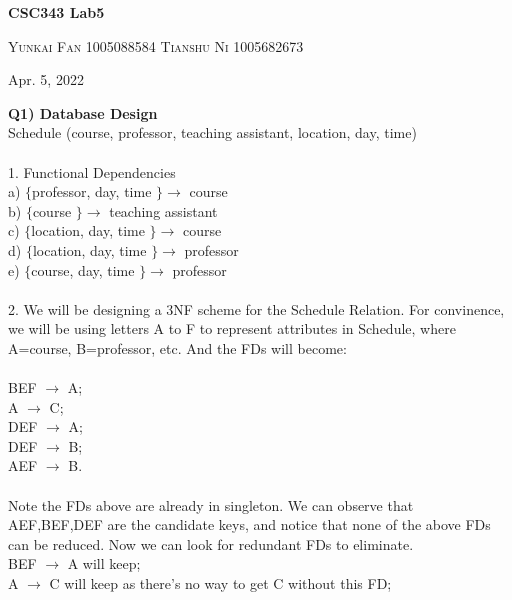 \documentclass[12pt]{article}
\begin{document}
\begin{center}
\begin{Large}
  \textbf{CSC343 Lab5}\\
\end{Large}

\begin{center}
  \textsc{Yunkai Fan 1005088584 \vskip5pt}  
  \textsc{Tianshu Ni 1005682673\vskip5pt} 
\end{center}

\begin{center}
	Apr. 5, 2022
\end{center} 
\date{5 Apr 2022}
\end{center}
 

\textbf{Q1) Database Design}\\
Schedule (course, professor, teaching assistant, location, day, time)\\ \\
1. Functional Dependencies\\
a) $\{$professor, day, time $\} \longrightarrow$ course \\
b) $\{$course $\} \longrightarrow$ teaching assistant\\
c) $\{$location, day, time $\} \longrightarrow$ course\\
d) $\{$location, day, time $\} \longrightarrow$ professor\\
e) $\{$course, day, time $\} \longrightarrow$ professor \\
\\
2. We will be designing a 3NF scheme for the Schedule Relation. For convinence, we will be using letters A to F to represent attributes in Schedule, where A=course, B=professor, etc. And the FDs will become: \\
\\
BEF $\rightarrow$ A;\\
A $\rightarrow$ C;\\
DEF $\rightarrow$ A;\\
DEF $\rightarrow$ B;\\
AEF $\rightarrow$ B.\\
\\
Note the FDs above are already in singleton. We can observe that AEF,BEF,DEF are the candidate keys, and notice that none of the above FDs can be reduced. Now we can look for redundant FDs to eliminate.\\
BEF $\rightarrow$ A will keep;\\
A $\rightarrow$ C will keep as there's no way to get C without this FD;\\
\end{document}
